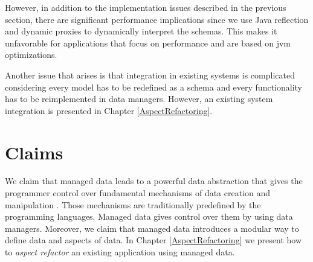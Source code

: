 However, in addition to the implementation issues described in the previous section, there are significant performance implications since we use Java reflection and dynamic proxies to dynamically interpret the schemas. 
This makes it unfavorable for applications that focus on performance and are based on \ac{jvm} optimizations.

Another issue that arises is that integration in existing systems is complicated considering every model has to be redefined as a schema and every functionality has to be reimplemented in data managers.
However, an existing system integration is presented in Chapter \ref{AspectRefactoring}.

\section{Claims}\label{Implementation Claims}
We claim that managed data leads to a powerful data abstraction that gives the programmer control over fundamental mechanisms of data creation and manipulation \cite{loh2012managed}.
Those mechanisms are traditionally predefined by the programming languages. 
Managed data gives control over them by using data managers.
Moreover, we claim that managed data introduces a modular way to define data and aspects of data. 
In Chapter \ref{AspectRefactoring} we present how to \textit{aspect refactor} an existing application using managed data.
